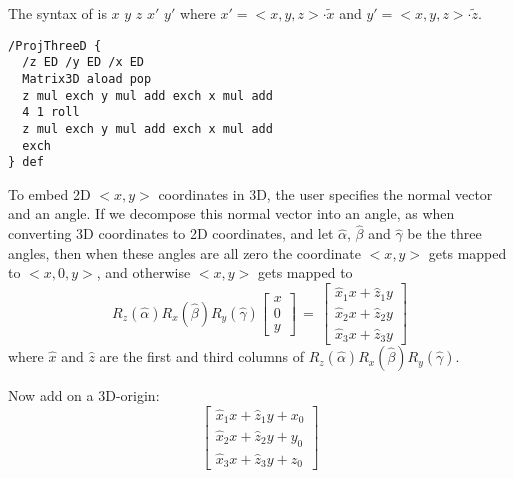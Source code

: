 \documentclass[11pt,english,BCOR10mm,DIV12,bibliography=totoc,parskip=false,smallheadings
    headexclude,footexclude,oneside,dvipsnames,svgnames]{pst-doc}
\def\la{<}
\def\ra{>}
\begin{document}
The syntax of  is $x$ $y$ $z$  $x'$ $y'$
where $x'=\la x, y, z\ra \cdot \tilde{x}$ and $y'=\la x, y, z\ra \cdot
\tilde{z}$.

\begin{lstlisting}
/ProjThreeD {
  /z ED /y ED /x ED
  Matrix3D aload pop
  z mul exch y mul add exch x mul add
  4 1 roll
  z mul exch y mul add exch x mul add
  exch
} def
\end{lstlisting}

 To embed 2D $\la x, y\ra$ coordinates in 3D, the user specifies the normal
 vector and an angle. If we decompose this normal vector into an angle, as
 when converting 3D coordinates to 2D coordinates, and let $\hat\alpha$,
 $\hat\beta$ and $\hat\gamma$ be the three angles, then when these angles are
 all zero the coordinate $\la x, y\ra$ gets mapped to $\la x, 0, y\ra$, and
 otherwise $\la x, y\ra$ gets mapped to
 \[
   R_z(\hat\alpha) R_x(\hat\beta) R_y(\hat\gamma)
   \left[ \begin{array}{c} x \\ 0 \\ y \end{array} \right]
  \, = \,
   \left[ \begin{array}{c}
    \hat{x}_1 x + \hat{z}_1 y\\
    \hat{x}_2 x + \hat{z}_2 y\\
    \hat{x}_3 x + \hat{z}_3 y
   \end{array} \right]
 \]
 where $\hat{x}$ and $\hat{z}$ are the first and third columns of
 $R_z(\hat\alpha) R_x(\hat\beta) R_y(\hat\gamma)$.

 Now add on a 3D-origin:
 \[
   \left[ \begin{array}{c}
    \hat{x}_1 x + \hat{z}_1 y + x_0\\
    \hat{x}_2 x + \hat{z}_2 y + y_0\\
    \hat{x}_3 x + \hat{z}_3 y + z_0
   \end{array} \right]
 \]
\end{document}
